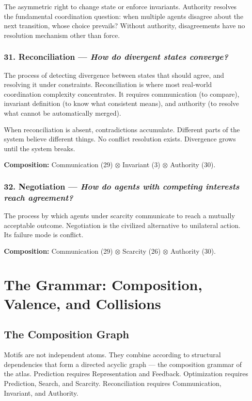 \documentclass[11pt,a4paper]{article}
\newcommand{\question}[1]{\textit{#1}}
\newcommand{\comp}{\mathbin{\otimes}}
\begin{document}
The asymmetric right to change state or enforce invariants. Authority resolves the fundamental coordination question: when multiple agents disagree about the next transition, whose choice prevails? Without authority, disagreements have no resolution mechanism other than force.

\subsubsection{31. Reconciliation --- \question{How do divergent states converge?}}

The process of detecting divergence between states that should agree, and resolving it under constraints. Reconciliation is where most real-world coordination complexity concentrates. It requires communication (to compare), invariant definition (to know what consistent means), and authority (to resolve what cannot be automatically merged).

When reconciliation is absent, contradictions accumulate. Different parts of the system believe different things. No conflict resolution exists. Divergence grows until the system breaks.

\textbf{Composition:} Communication (29) $\comp$ Invariant (3) $\comp$ Authority (30).

\subsubsection{32. Negotiation --- \question{How do agents with competing interests reach agreement?}}

The process by which agents under scarcity communicate to reach a mutually acceptable outcome. Negotiation is the civilized alternative to unilateral action. Its failure mode is conflict.

\textbf{Composition:} Communication (29) $\comp$ Scarcity (26) $\comp$ Authority (30).

\section{The Grammar: Composition, Valence, and Collisions}

\subsection{The Composition Graph}

Motifs are not independent atoms. They combine according to structural dependencies that form a directed acyclic graph --- the composition grammar of the atlas. Prediction requires Representation and Feedback. Optimization requires Prediction, Search, and Scarcity. Reconciliation requires Communication, Invariant, and Authority.
\end{document}
